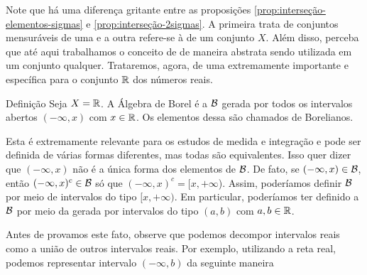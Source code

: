Note que há uma diferença gritante entre as proposições \ref{prop:interseção-elementos-sigmas} e \ref{prop:interseção-2sigmas}.
A primeira trata de conjuntos mensuráveis de uma \sigal e a outra refere-se à \sigals de um conjunto $X$.
Além disso, perceba que até aqui trabalhamos o conceito de \sigal de maneira abstrata sendo utilizada em um conjunto qualquer. 
Trataremos, agora, de uma \sigal extremamente importante e específica para o conjunto $\mathbb{R}$ dos números reais.

\begin{env}{Definição}
\label{def:algebra-borel}
    Seja $X = \mathbb{R}$. A Álgebra de Borel é a \sigal $\operatorname{\mathcal{B}}$ gerada por todos os intervalos abertos $(-\infty,x)$ com $ x  \in \mathbb{R}$. 
    Os elementos dessa \sigal são chamados de Borelianos.
    \vspace{-0.2cm}
\end{env}

Esta \sigal é extremamente relevante para os estudos de medida e integração e pode ser definida de várias formas diferentes, mas todas são equivalentes.
Isso quer dizer que $(-\infty, x)$ não é a única forma dos elementos de $\operatorname{\mathcal{B}}$. 
De fato, se  $(-\infty, x) \in \operatorname{\mathcal{B}}$, então $(-\infty, x)^c \in \operatorname{\mathcal{B}}$ só que $(-\infty, x)^c = [x, +\infty$).
Assim, poderíamos  definir  $\operatorname{\mathcal{B}}$ por meio de intervalos do tipo $[x, +\infty)$.
Em particular, poderíamos ter definido a $\operatorname{\mathcal{B}}$ por meio da \sigal gerada por intervalos do tipo $(a,b)$ com $a,b \in \mathbb{R}$. 

Antes de provamos este fato, observe que podemos decompor intervalos reais como a união de outros intervalos reais. 
Por exemplo, utilizando a reta real, podemos representar intervalo $(-\infty, b)$ da seguinte maneira\\

